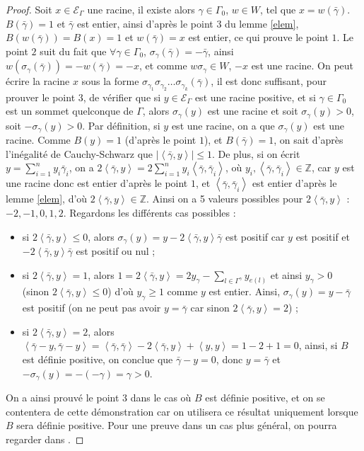 \documentclass[a4paper,10pt]{article}
\newcommand{\ps}[2]{\left\langle#1,#2\right\rangle}
\newcommand{\EG}{\mathscr{E}_\Gamma}
\begin{document}
\begin{proof}
	Soit $x\in\EG$ une racine, il existe alors $\gamma\in\Gamma_0$, $w\in W$, tel que $x=w(\bar\gamma)$. $B(\bar\gamma)=1$ et $\bar\gamma$ est entier, ainsi d'après le point $3$ du lemme \ref{elem}, $B(w(\bar\gamma))=B(x)=1$ et $w(\bar\gamma)=x$ est entier, ce qui prouve le point $1$. Le point $2$ suit du fait que $\forall\gamma\in\Gamma_0$, $\sigma_\gamma(\bar\gamma)=-\bar\gamma$, ainsi $w(\sigma_\gamma(\bar\gamma))=-w(\bar\gamma)=-x$, et comme $w\sigma_\gamma\in W$, $-x$ est une racine. On peut écrire la racine $x$ sous la forme $\sigma_{\gamma_1}\sigma_{\gamma_2}\dots\sigma_{\gamma_k}(\bar\gamma)$, il est donc suffisant, pour prouver le point $3$, de vérifier que si $y\in\EG$ est une racine positive, et si $\gamma\in\Gamma_0$ est un sommet quelconque de $\Gamma$, alors $\sigma_\gamma(y)$ est une racine et soit $\sigma_\gamma(y)>0$, soit $-\sigma_\gamma(y)>0$. Par définition, si $y$ est une racine, on a que $\sigma_\gamma(y)$ est une racine. Comme $B(y)=1$ (d'après le point $1$), et $B(\bar\gamma)=1$, on sait d'après l'inégalité de Cauchy-Schwarz que $|\ps{\bar\gamma}{y}|\leq1$. De plus, si on écrit $y=\sum_{i=1}^ny_{i}\bar\gamma_i$, on a $2\ps{\bar\gamma}{y}=2\sum_{i=1}^ny_i\ps{\bar\gamma}{\bar\gamma_i}$, où $y_i,\ps{\bar\gamma}{\bar\gamma_i}\in\mathbb Z$, car $y$ est une racine donc est entier d'après le point $1$, et $\ps{\bar\gamma}{\bar\gamma_i}$ est entier d'après le lemme \ref{elem}, d'où $2\ps{\bar\gamma}{y}\in\mathbb Z$. Ainsi on a 5 valeurs possibles pour $2\ps{\bar\gamma}{y}$ : $-2,-1,0,1,2$. Regardons les différents cas possibles :
	\begin{itemize}
		\item si $2\ps{\bar\gamma}{y}\leq0$, alors $\sigma_\gamma(y)=y-2\ps{\bar\gamma}{y}\bar\gamma$ est positif car $y$ est positif et $-2\ps{\bar\gamma}{y}\bar\gamma$ est positif ou nul ;
		\item si $2\ps{\bar\gamma}{y}=1$, alors $1=2\ps{\bar\gamma}{y}=2y_\gamma-\sum_{l\in\Gamma^\gamma}y_{e(l)}$ et ainsi $y_\gamma>0$ (sinon $2\ps{\bar\gamma}{y}\leq0$) d'où $y_\gamma\geq1$ comme $y$ est entier. Ainsi, $\sigma_\gamma(y)=y-\bar\gamma$ est positif (on ne peut pas avoir $y=\bar\gamma$ car sinon $2\ps{\bar\gamma}{y}=2$) ;
		\item si $2\ps{\bar\gamma}{y}=2$, alors $\ps{\bar\gamma-y}{\bar\gamma-y}=\ps{\bar\gamma}{\bar\gamma}-2\ps{\bar\gamma}{y}+\ps{y}{y}=1-2+1=0$, ainsi, si $B$ est définie positive, on conclue que $\bar\gamma-y=0$, donc $y=\bar\gamma$ et $-\sigma_\gamma(y)=-(-\gamma)=\gamma>0$.
	\end{itemize}
	On a ainsi prouvé le point $3$ dans le cas où $B$ est définie positive, et on se contentera de cette démonstration car on utilisera ce résultat uniquement lorsque $B$ sera définie positive. Pour une preuve dans un cas plus général, on pourra regarder dans \cite{S66}. 
\end{proof}
\end{document}
